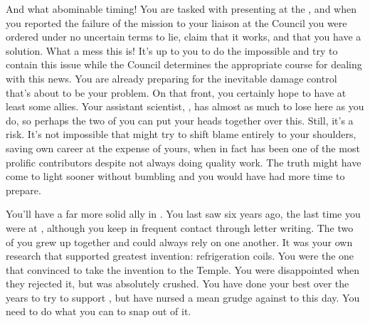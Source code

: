 \documentclass[char]{GL2020}
\begin{document}
And what abominable timing!  You are tasked with presenting at the \pSchool{}, and when you reported the failure of the mission to your liaison at the Council you were ordered under no uncertain terms to lie, claim that it works, and that you have a solution. What a mess this is!  It’s up to you to do the impossible and try to contain this issue while the Council determines the appropriate course for dealing with this news. You are already preparing for the inevitable damage control that’s about to be your problem. On that front, you certainly hope to have at least some allies. Your assistant scientist, \cAssistantScientist{}, has almost as much to lose here as you do, so perhaps the two of you can put your heads together over this. Still, it’s a risk. It’s not impossible that \cAssistantScientist{\they} might try to shift blame entirely to your shoulders, saving \cAssistantScientist{\their} own career at the expense of yours, when in fact \cAssistantScientist{} has been one of the most prolific contributors despite not always doing quality work. The truth might have come to light sooner without \cAssistantScientist{\their} bumbling and you would have had more time to prepare.

You’ll have a far more solid ally in \cChupInventor{}. You last saw \cChupInventor{\them} six years ago, the last time you were at \pSc{}, although you keep in frequent contact through letter writing. The two of you grew up together and could always rely on one another. It was your own research that supported \cChupInventor{\their} greatest invention: refrigeration coils. You were the one that convinced \cChupInventor{} to take the invention to the Temple. You were disappointed when they rejected it, but \cChupInventor{} was absolutely crushed. You have done your best over the years to try to support \cChupInvetor{}, but \cChupInventor{\they} have nursed a mean grudge against \cChupInventor{\plural} to this day. You need to do what you can to snap \cChupInventor{\them} out of it.
\end{document}
